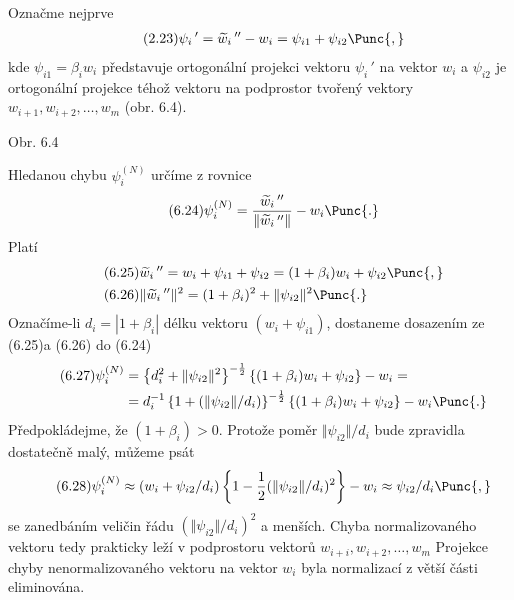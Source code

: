 Označme nejprve 
%
\begin{align*}
  \tag{2.23}
  \psi_i\,' = \widetilde w_i\,'' - w_i
  = \psi_{i1} + \psi_{i2} \Punc{,}
\end{align*}
%
kde $\psi_{i1} = \beta_i w_i$ představuje ortogonální projekci vektoru
$\psi_i\,'$ na vektor $w_i$ a $\psi_{i2}$ je ortogonální projekce
téhož vektoru na podprostor tvořený vektory
$w_{i+1},w_{i+2},\dots,w_m$ (obr. 6.4).
%
\begin{center}

Obr. 6.4
\end{center}
%
Hledanou chybu $\psi_i^{(N)}$ určíme z rovnice
%
\begin{align*}
  \tag{6.24}
  \psi_i^{(N)}
    = \frac{\widetilde w_i\,''}{\Vert\widetilde w_i\,''\Vert} - w_i \Punc{.}
\end{align*}
%
Platí
%
\begin{align*}
  \tag{6.25}
  &\widetilde w_i\,'' = w_i + \psi_{i1} + \psi_{i2}
  = (1 + \beta_i)w_i + \psi_{i2} \Punc{,} \\
  \tag{6.26}
  &\Vert\widetilde w_i\,''\Vert^2 = (1 + \beta_i)^2 + \Vert\psi_{i2} \Vert^2 \Punc{.}
\end{align*}
%
Označíme-li $d_i = |1 + \beta_i|$ délku vektoru $(w_i + \psi_{i1})$,
dostaneme dosazením ze (6.25)a (6.26) do (6.24)
%
\begin{align*}
  \tag{6.27}
  \psi_i^{(N)} &=
  \left\{ d_i^2 + \Vert \psi_{i2} \Vert^2 \right\}^{-{1\over2}}
  \left\{(1 + \beta_i)w_i + \psi_{i2} \right\} - w_i = \\
  &= d_i^{-1} \left\{ 1 + (\Vert\psi_{i2}\Vert/d_i) \right\}^{-{1\over2}}
  \left\{(1+\beta_i)w_i + \psi_{i2} \right\} - w_i \Punc{.}
\end{align*}
%
Předpokládejme, že $(1+\beta_i) > 0$. Protože poměr $\Vert \psi_{i2}
\Vert/d_i$ bude zpravidla dostatečně malý, můžeme psát
%
\begin{align*}
  \tag{6.28}
  \psi_i^{(N)}\approx
  (w_i + \psi_{i2}/d_i)
  \left\{1 - {1\over2}(\Vert\psi_{i2}\Vert/d_i)^2\right\} - w_i
  \approx \psi_{i2}/d_i \Punc{,}
\end{align*}
%
se  zanedbáním veličin řádu $(\Vert\psi_{i2}\Vert/d_i)^2$ a
menších. Chyba normalizovaného vektoru tedy prakticky leží v
podprostoru vektorů $w_{i+i},w_{i+2},\dots,w_m$ Projekce chyby
nenormalizovaného vektoru na vektor $w_i$ byla normalizací z větší
části eliminována.

